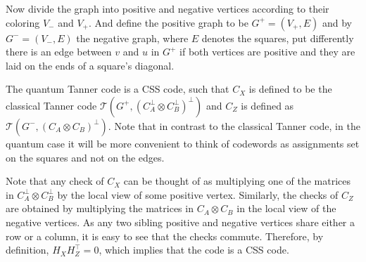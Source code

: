 \begin{definition}
Now divide the graph into positive and negative vertices according to their coloring $V_{-}$ and $V_{+}$. And define the positive graph to be $G^{+} = \left( V_{+}, E \right)$ and by $G^{-} = \left( V_{-}, E \right)$ the negative graph, where $E$ denotes the squares, put differently there is an edge between $v$ and $u$ in $G^{+}$ if both vertices are positive and they are laid on the ends of a square's diagonal.


The quantum Tanner code is a CSS code, such that $C_{X}$ is defined to be the classical Tanner code $\mathcal{T}\left(G^{+}, \left(C_{A}^\perp\otimes C_{B}^{\perp}\right)^{\perp} \right)$ and $C_{Z}$ is defined as $\mathcal{T}\left(G^{-}, \left(C_{A}\otimes C_{B}\right)^{\perp} \right)$. Note that in contrast to the classical Tanner code, in the quantum case it will be more convenient to think of codewords as assignments set on the squares and not on the edges.
\end{definition}
Note that any check of $C_X$ can be thought of as multiplying one of the matrices in $C_A^\perp \otimes C_B^\perp$ by the local view of some positive vertex. Similarly, the checks of $C_Z$ are obtained by multiplying the matrices in $C_A \otimes C_B$ in the local view of the negative vertices. As any two sibling positive and negative vertices share either a row or a column, it is easy to see that the checks commute. Therefore, by definition, $H_{X}H_{Z}^{\top} =0$, which implies that the code is a CSS code.


